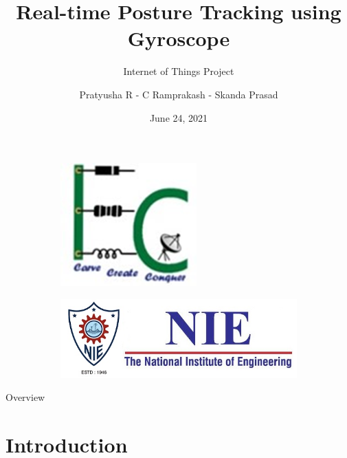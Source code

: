 \documentclass[aspectratio=169,xcolor=dvipsnames]{beamer}
\title{Real-time Posture Tracking using Gyroscope}
\subtitle{Internet of Things Project}
\author[Pin-Yen]{Pratyusha R - C Ramprakash - Skanda Prasad}
\institute %
{
    Department of Electronics and Communication Engineering

    6th Semester, A Section
    \vskip 3pt
}
\date{June 24, 2021} %
\begin{document}
\begin{frame}
    \begin{figure}
     \centering
     \begin{subfigure}[b]{0.49\textwidth}
         \centering
         \includegraphics[scale=0.35]{ecelogo.png}
     \end{subfigure}
     \hfill
     \begin{subfigure}[b]{0.49\textwidth}
         \centering
         \includegraphics[scale=0.35]{New_NIE_Logo.png}
     \end{subfigure}
     \end{figure}
    \titlepage
\end{frame}

\begin{frame}{Overview}
    \tableofcontents
\end{frame}

\section{Introduction}
\end{document}
